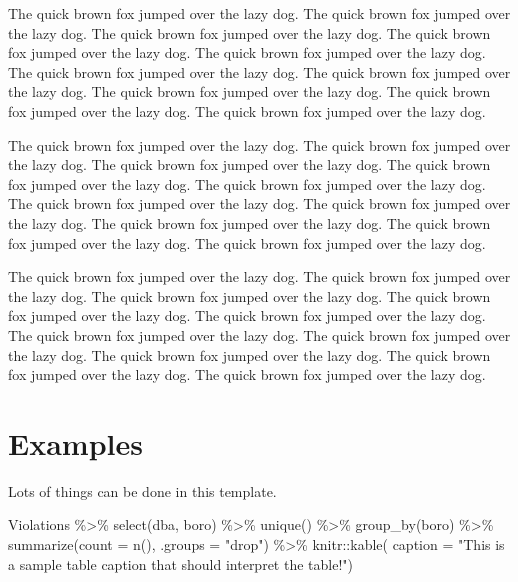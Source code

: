 \documentclass[12pt]{article}
\newenvironment{Shaded}{\begin{snugshade}}{\end{snugshade}}
\newcommand{\AttributeTok}[1]{\textcolor[rgb]{0.77,0.63,0.00}{#1}}
\newcommand{\FunctionTok}[1]{\textcolor[rgb]{0.00,0.00,0.00}{#1}}
\newcommand{\NormalTok}[1]{#1}
\newcommand{\SpecialCharTok}[1]{\textcolor[rgb]{0.00,0.00,0.00}{#1}}
\newcommand{\StringTok}[1]{\textcolor[rgb]{0.31,0.60,0.02}{#1}}
\begin{document}
The quick brown fox jumped over the lazy dog. The quick brown fox jumped
over the lazy dog. The quick brown fox jumped over the lazy dog. The
quick brown fox jumped over the lazy dog. The quick brown fox jumped
over the lazy dog. The quick brown fox jumped over the lazy dog. The
quick brown fox jumped over the lazy dog. The quick brown fox jumped
over the lazy dog. The quick brown fox jumped over the lazy dog. The
quick brown fox jumped over the lazy dog.

The quick brown fox jumped over the lazy dog. The quick brown fox jumped
over the lazy dog. The quick brown fox jumped over the lazy dog. The
quick brown fox jumped over the lazy dog. The quick brown fox jumped
over the lazy dog. The quick brown fox jumped over the lazy dog. The
quick brown fox jumped over the lazy dog. The quick brown fox jumped
over the lazy dog. The quick brown fox jumped over the lazy dog. The
quick brown fox jumped over the lazy dog.

The quick brown fox jumped over the lazy dog. The quick brown fox jumped
over the lazy dog. The quick brown fox jumped over the lazy dog. The
quick brown fox jumped over the lazy dog. The quick brown fox jumped
over the lazy dog. The quick brown fox jumped over the lazy dog. The
quick brown fox jumped over the lazy dog. The quick brown fox jumped
over the lazy dog. The quick brown fox jumped over the lazy dog. The
quick brown fox jumped over the lazy dog.

\hypertarget{examples}{%
\section{Examples}\label{examples}}

Lots of things can be done in this template.

\begin{Shaded}
\begin{Highlighting}[]
\NormalTok{Violations }\SpecialCharTok{\%\textgreater{}\%}
  \FunctionTok{select}\NormalTok{(dba, boro) }\SpecialCharTok{\%\textgreater{}\%}
  \FunctionTok{unique}\NormalTok{() }\SpecialCharTok{\%\textgreater{}\%}
  \FunctionTok{group\_by}\NormalTok{(boro) }\SpecialCharTok{\%\textgreater{}\%}
  \FunctionTok{summarize}\NormalTok{(}\AttributeTok{count =} \FunctionTok{n}\NormalTok{(), }\AttributeTok{.groups =} \StringTok{"drop"}\NormalTok{) }\SpecialCharTok{\%\textgreater{}\%}
\NormalTok{  knitr}\SpecialCharTok{::}\FunctionTok{kable}\NormalTok{(}
    \AttributeTok{caption =} \StringTok{"This is a sample table caption that should interpret the table!"}\NormalTok{)}
\end{Highlighting}
\end{Shaded}
\end{document}
